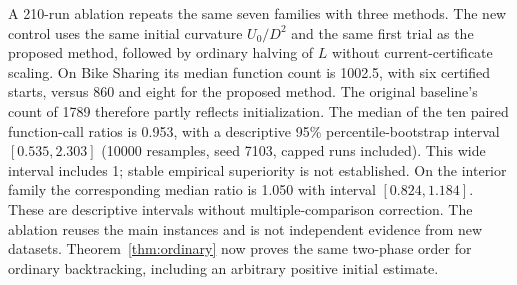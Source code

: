 A 210-run ablation repeats the same seven families with three methods.
The new control uses the same initial curvature $U_0/D^2$ and the same
first trial as the proposed method, followed by ordinary halving of $L$
without current-certificate scaling. On Bike Sharing its median function
count is 1002.5, with six certified starts, versus 860 and eight for the
proposed method. The original baseline's count of 1789 therefore partly
reflects initialization. The median of the ten paired function-call ratios
is 0.953, with a descriptive 95\% percentile-bootstrap interval
$[0.535,2.303]$ (10000 resamples, seed 7103, capped runs included).
This wide interval includes 1; stable empirical superiority is not
established. On the interior family the corresponding median ratio is
1.050 with interval $[0.824,1.184]$. These are descriptive intervals
without multiple-comparison correction. The ablation reuses the main
instances and is not independent evidence from new datasets.
Theorem~\ref{thm:ordinary} now proves the same two-phase order for ordinary
backtracking, including an arbitrary positive initial estimate.
